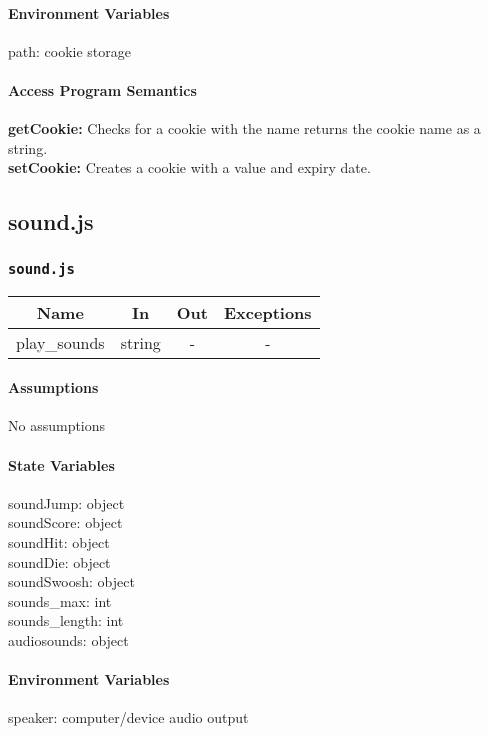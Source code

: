 \documentclass[11pt, oneside]{article}   	%
\begin{document}
\paragraph{Environment Variables}
path: cookie storage

\paragraph{Access Program Semantics} 
 \textbf{getCookie:} Checks for a cookie with the name returns the cookie name as a string.\\
 \textbf{setCookie:} Creates a cookie with a value and expiry date.


\subsection{sound.js}
\subsubsection{\texttt{sound.js}}
\begin{center}
\begin{tabular}{ |c|c|c|c| } 
 \hline
 Name & In & Out & Exceptions \\ 
 \hline \hline
 play\_sounds & string & - & - \\ 
 \hline
\end{tabular}
\end{center}

\paragraph{Assumptions}
No assumptions

\paragraph{State Variables}
soundJump: object\\
soundScore: object\\
soundHit: object\\
soundDie: object\\
soundSwoosh: object\\
sounds\_max: int\\
sounds\_length: int\\
audiosounds: object\\
\paragraph{Environment Variables}
speaker: computer/device audio output
\end{document}
